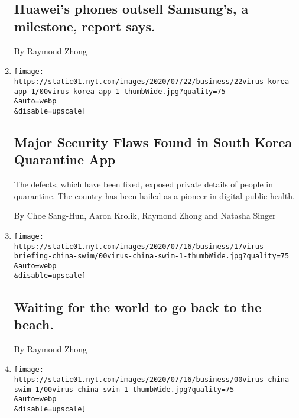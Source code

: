 \begin{enumerate}
  \hypertarget{huaweis-phones-outsell-samsungs-a-milestone-report-says}{%
  \subsection{Huawei's phones outsell Samsung's, a milestone, report
  says.}\label{huaweis-phones-outsell-samsungs-a-milestone-report-says}}

  By Raymond Zhong
\item
  \href{/2020/07/21/technology/korea-coronavirus-app-security.html}{}

  \texttt{[image: https://static01.nyt.com/images/2020/07/22/business/22virus-korea-app-1/00virus-korea-app-1-thumbWide.jpg?quality=75\\\&auto=webp\\\&disable=upscale]}

  \hypertarget{major-security-flaws-found-in-south-korea-quarantine-app}{%
  \subsection{Major Security Flaws Found in South Korea Quarantine
  App}\label{major-security-flaws-found-in-south-korea-quarantine-app}}

  The defects, which have been fixed, exposed private details of people
  in quarantine. The country has been hailed as a pioneer in digital
  public health.

  By Choe Sang-Hun, Aaron Krolik, Raymond Zhong and Natasha Singer
\item
  \href{/live/2020/07/17/business/stock-market-today-coronavirus/waiting-for-the-world-to-go-back-to-the-beach}{}

  \texttt{[image: https://static01.nyt.com/images/2020/07/16/business/17virus-briefing-china-swim/00virus-china-swim-1-thumbWide.jpg?quality=75\\\&auto=webp\\\&disable=upscale]}

  \hypertarget{waiting-for-the-world-to-go-back-to-the-beach}{%
  \subsection{Waiting for the world to go back to the
  beach.}\label{waiting-for-the-world-to-go-back-to-the-beach}}

  By Raymond Zhong
\item
  \href{/2020/07/17/business/china-coronavirus-swimsuits.html}{}

  \texttt{[image: https://static01.nyt.com/images/2020/07/16/business/00virus-china-swim-1/00virus-china-swim-1-thumbWide.jpg?quality=75\\\&auto=webp\\\&disable=upscale]}


\end{enumerate}
